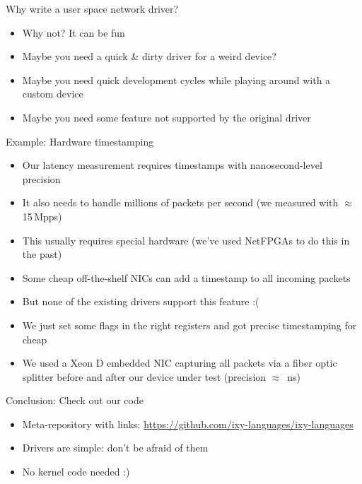 \documentclass[NET,english,aspectratio=169,notitleframe]{tumbeamer}
\begin{document}
\begin{frame}{Why write a user space network driver?}
\begin{itemize}
\item Why not? It can be fun
\item Maybe you need a quick \& dirty driver for a weird device?
\item Maybe you need quick development cycles while playing around with a custom device
\item Maybe you need some feature not supported by the original driver
\end{itemize}
\end{frame}


\begin{frame}{Example: Hardware timestamping}
\begin{itemize}
\item Our latency measurement requires timestamps with nanosecond-level precision
\item It also needs to handle millions of packets per second (we measured with $\approx$ 15\,Mpps)
\item This usually requires special hardware (we've used NetFPGAs to do this in the past)
\pause
\vspace{1em}
\item Some cheap off-the-shelf NICs can add a timestamp to all  incoming packets
\item But none of the existing drivers support this feature :(
\pause
\item We just set some flags in the right registers and got precise timestamping for cheap
\item We used a Xeon D embedded NIC capturing all packets via a fiber optic splitter before and after our device under test (precision $\approx$ \,ns)
\end{itemize}
\end{frame}


\begin{frame}{Conclusion: Check out our code}
\begin{itemize}
\item Meta-repository with links: \url{https://github.com/ixy-languages/ixy-languages}
\item Drivers are simple: don't be afraid of them
\item No kernel code needed :)
\end{itemize}
\end{frame}
\end{document}
